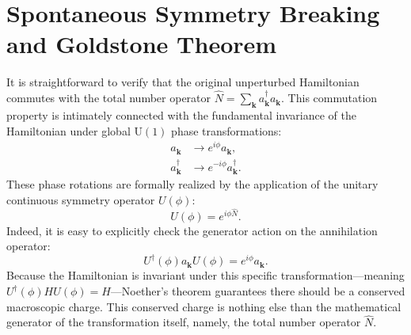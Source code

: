 \section[Spontaneous Symmetry Breaking and Goldstone Theorem]{Spontaneous Symmetry Breaking\\and Goldstone Theorem}

It is straightforward to verify that the original unperturbed Hamiltonian commutes with the total number operator \( \hat{N} = \sum_{\mathbf{k}} a_{\mathbf{k}}^\dagger a_{\mathbf{k}} \). This commutation property is intimately connected with the fundamental invariance of the Hamiltonian under global \( \text{U}(1) \) phase transformations:
\[
    \begin{aligned}
        a_{\mathbf{k}}         & \to e^{i\phi} a_{\mathbf{k}},          \\
        a_{\mathbf{k}}^\dagger & \to e^{-i\phi} a_{\mathbf{k}}^\dagger.
    \end{aligned}
\]
These phase rotations are formally realized by the application of the unitary continuous symmetry operator \( U(\phi) \):
\[
    U(\phi) = e^{i\phi\hat{N}}.
\]
Indeed, it is easy to explicitly check the generator action on the annihilation operator:
\[
    U^\dagger(\phi) a_{\mathbf{k}} U(\phi) = e^{i\phi} a_{\mathbf{k}}.
\]
Because the Hamiltonian is invariant under this specific transformation—meaning \( U^\dagger(\phi) H U(\phi) = H \)—Noether's theorem guarantees there should be a conserved macroscopic charge. This conserved charge is nothing else than the mathematical generator of the transformation itself, namely, the total number operator \( \hat{N} \).

